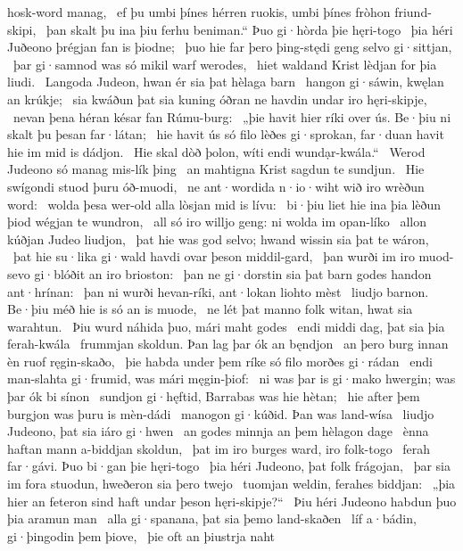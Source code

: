 hosk-word manag, \hld\ ef þu umbi þínes hérren ruokis,
umbi þínes fròhon friund-skipi, \hld\ þan skalt þu ina þiu ferhu beniman.“
Þuo gi·hòrda þie hęri-togo \hld\ þia héri Juðeono
þrégjan fan is þiodne; \hld\ þuo hie far þero þing-stędi geng
selvo gi·sittjan, \hld\ þar gi·samnod was
só mikil warf werodes, \hld\ hiet waldand Krist
lèdjan for þia liudi. \hld\ Langoda Judeon,
hwan ér sia þat hèlaga barn \hld\ hangon gi·sáwin,
kwęlan an krúkje; \hld\ sia kwáðun þat sia kuning óðran
ne havdin undar iro hęri-skipje, \hld\ nevan þena héran késar
fan Rúmu-burg: \hld\ „þie havit hier ríki over ús.
Be·þiu ni skalt þu þesan far·látan; \hld\ hie havit ús só filo lèðes gi·sprokan,
far·duan havit hie im mid is dádjon. \hld\ Hie skal dòð þolon,
wíti endi wundạr-kwála.“ \hld\ Werod Judeono
só manag mis-lík þing \hld\ an mahtigna Krist
sagdun te sundjun. \hld\ Hie swígondi stuod
þuru óð-muodi, \hld\ ne ant·wordida n·io·wiht
wið iro wrèðun word: \hld\ wolda þesa wer-old alla
lòsjan mid is lívu: \hld\ bi·þiu liet hie ina þia lèðun þiod
wégjan te wundron, \hld\ all só iro willjo geng:
ni wolda im opan-líko \hld\ allon kúðjan
Judeo liudjon, \hld\ þat hie was god selvo;
hwand wissin sia þat te wáron, \hld\ þat hie su·lika gi·wald havdi
ovar þeson middil-gard, \hld\ þan wurði im iro muod-sevo
gi·blóðit an iro brioston: \hld\ þan ne gi·dorstin sia þat barn godes
handon ant·hrínan: \hld\ þan ni wurði hevan-ríki,
ant·lokan liohto mèst \hld\ liudjo barnon.
Be·þiu méð hie is só an is muode, \hld\ ne lét þat manno folk
witan, hwat sia warahtun. \hld\ Þiu wurd náhida þuo,
mári maht godes \hld\ endi middi dag,
þat sia þia ferah-kwála \hld\ frummjan skoldun.
Þan lag þar ók an bęndjon \hld\ an þero burg innan
èn ruof ręgin-skaðo, \hld\ þie habda under þem ríke só filo
morðes gi·rádan \hld\ endi man-slahta gi·frumid,
was mári męgin-þiof: \hld\ ni was þar is gi·mako hwergin;
was þar ók bi sínon \hld\ sundjon gi·hęftid,
Barrabas was hie hètan; \hld\ hie after þem burgjon was
þuru is mèn-dádi \hld\ manogon gi·kúðid.
Þan was land-wísa \hld\ liudjo Judeono,
þat sia iáro gi·hwen \hld\ an godes minnja
an þem hèlagon dage \hld\ ènna haftan mann
a-biddjan skoldun, \hld\ þat im iro burges ward,
iro folk-togo \hld\ ferah far·gávi.
Þuo bi·gan þie hęri-togo \hld\ þia héri Judeono,
þat folk frágojan, \hld\ þar sia im fora stuodun,
hweðeron sia þero twejo \hld\ tuomjan weldin,
ferahes biddjan: \hld\ „þia hier an feteron sind
haft undar þeson hęri-skipje?“ \hld\ Þiu héri Judeono
habdun þuo þia aramun man \hld\ alla gi·spanana,
þat sia þemo land-skaðen \hld\ líf a·bádin,
gi·þingodin þem þiove, \hld\ þie oft an þiustrja naht
